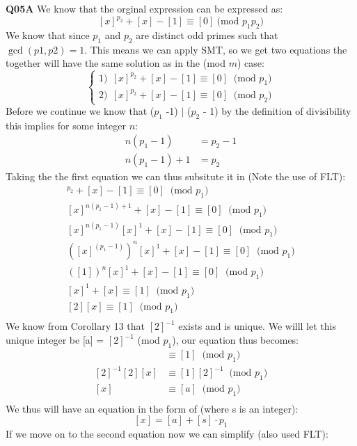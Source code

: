 \documentclass[11pt]{article}
\begin{document}
\parindent=0pt

\textbf{Q05A} We know that the orginal expression can be expressed as:
\[ [x]^{p_2} + [x] - [1] \equiv [0] \ \text{(mod $p_1p_2$)} \]
We know that since $p_1$ and $p_2$ are distinct odd primes such that $\gcd(p1,p2) = 1$. This means we can apply SMT, so we get two equations the together will have the same solution as in the (mod $m$) case:
$$
\begin{cases}
1) \ \ [x]^{p_2} + [x] - [1] \equiv [0] \ \text{ (mod $p_1$)} \\
2) \ \ [x]^{p_2} + [x] - [1] \equiv [0] \ \text{ (mod $p_2$)}
\end{cases}
$$
Before we continue we know that ($p_1$ -1) $|$ ($p_2$ - 1) by the definition of divisibility this implies for some integer $n$:
\begin{align*}
 n(p_1 -1) & = p_2 -1 \\
 n(p_1 -1) + 1 & = p_2 
\end{align*}
Taking the the first equation we can thus subsitute it in (Note the use of FLT):
\begin{align*}
 [x]^{p_2} + [x] - [1] \equiv [0] \ \text{ (mod $p_1$)} \\
 [x]^{ n(p_1 -1) + 1} + [x] - [1] \equiv [0]  \ \text{ (mod $p_1$)} \\
 [x]^{ n(p_1 -1)}[x]^1 + [x] - [1] \equiv [0]  \ \text{ (mod $p_1$)} \\
 ([x]^{ (p_1 -1)})^{n}[x]^1 + [x] - [1] \equiv [0]  \ \text{ (mod $p_1$)} \\
 ([1])^{n}[x]^1 + [x] - [1] \equiv [0]  \ \text{ (mod $p_1$)} \\
 [x]^1 + [x] \equiv [1]  \ \text{ (mod $p_1$)} \\
 [2][x] \equiv [1]  \ \text{ (mod $p_1$)} \\
\end{align*}
We know from Corollary 13 that $[2]^{-1}$ exists and is unique. We willl let this unique integer be [a] = $[2]^{-1}$ (mod $p_1$), our equation thus becomes:
\begin{align*}
 [2][x] & \equiv [1]  \ \text{ (mod $p_1$)} \\
 [2]^{-1}[2][x] & \equiv [1][2]^{-1} \ \text{ (mod $p_1$)} \\
 [x] & \equiv [a] \ \text{ (mod $p_1$)} \\
\end{align*}
We thus will have an equation in the form of (where s is an integer):
\[ [x] = [a] + [s] \cdot p_1 \]
If we move on to the second equation now we can simplify (also used FLT):
\end{document}
